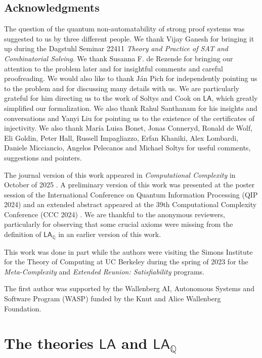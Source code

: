 \documentclass[11pt]{article}
\newcommand{\LA}{\mathsf{LA}}
\newcommand{\LAQ}{\mathsf{LA}_\mathbb{Q}}
\theoremstyle{definition}
\theoremstyle{plain}
\theoremstyle{remark}
\begin{document}
\subsection*{Acknowledgments}
The question of the quantum non-automatability of strong proof systems was suggested to us by three different people. We thank Vijay Ganesh for bringing it up during the Dagstuhl Seminar 22411 \emph{Theory and Practice of SAT and Combinatorial Solving}. We thank Susanna F. de Rezende for bringing our attention to the problem later and for insightful comments and careful proofreading. We would also like to thank Ján Pich for independently pointing us to the problem and for discussing many details with us. We are particularly grateful for him directing us to the work of Soltys and Cook on $\LA$, which greatly simplified our formalization. We also thank Rahul Santhanam for his insights and conversations and Yanyi Liu for pointing us to the existence of the certificates of injectivity. We also thank María Luisa Bonet, Jonas Conneryd, Ronald de Wolf, Eli Goldin, Peter Hall, Russell Impagliazzo, Erfan Khaniki, Alex Lombardi, Daniele Micciancio, Angelos Pelecanos and Michael Soltys for useful comments, suggestions and pointers.

The journal version of this work appeared in \emph{Computational Complexity} in October of 2025 \cite{ACG25_CC_journal}. A preliminary version of this work was presented at the poster session of the International Conference on Quantum Information Processing (QIP 2024) and an extended abstract appeared at the 39th Computational Complexity Conference (CCC 2024) \cite{ACG24_CCC}. We are thankful to the anonymous reviewers, particularly for observing that some crucial axioms were missing from the definition of $\LAQ$ in an earlier version of this work.


This work was done in part while the authors were visiting the Simons Institute for the Theory of Computing at UC Berkeley during the spring of 2023 for the \emph{Meta-Complexity} and \emph{Extended Reunion: Satisfiability} programs.

The first author was supported by the Wallenberg AI, Autonomous Systems and Software Program (WASP) funded by the Knut and Alice Wallenberg Foundation.

\printbibliography[
        heading=bibintoc
]

\newpage
\appendix

\section{The theories $\LA$ and $\LAQ$}
\end{document}
